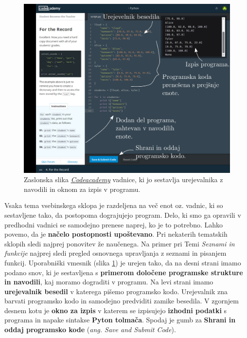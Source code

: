 \begin{figure}[h!]
  \centering
    \includegraphics [width=0.65\linewidth, keepaspectratio =
   1] {./images/sc_web/codeacademy_IDE_02.jpg}
   \caption{Zaslonska slika
     \emph{\href{https://www.codecademy.com/}{Codeacademy}}
     \cite{web:codeacademy} vadnice, ki jo sestavlja urejevalnika z
     navodili in oknom za izpis v programu.}
    \label{fig:scr:web:codeacademy:ide}
\end{figure}

Vsaka tema vsebinskega sklopa je razdeljena na več enot oz. vadnic, ki
so sestavljene tako, da postopoma dograjujejo program. Delo, ki smo ga
opravili v predhodni vadnici se samodejno prenese naprej, ko je to
potrebno. Lahko povemo, da je \textbf{načelo postopnosti
  upoštevano}. Pri nekaterih tematskih sklopih sledi najprej ponovitev
že naučenega. Na primer pri Temi \emph{Seznami in funkcije} najprej
sledi pregled osnovnega upravljanja z seznami in pisanjem funkcij.
Uporabniški vmesnik (slika \ref{fig:scr:web:codeacademy:ide}) je
urejen tako, da na desni strani imamo podano snov, ki je sestavljena s
\textbf{primerom določene programske strukture in navodili}, kaj
moramo dograditi v programu. Na levi strani imamo \textbf{urejevalnik
  besedil} v katerega pišemo programsko kodo. Urejevalnik zna barvati
programsko kodo in samodejno predviditi zamike besedila. V zgornjem
desnem kotu je \textbf{okno za izpis} v katerem se izpisujejo
\textbf{izhodni podatki} s programa in napake sintakse \textbf{Pyton
  tolmača}. Spodaj je gumb za \textbf{Shrani in oddaj programsko kode}
(\emph{ang. Save and Submit Code}).

